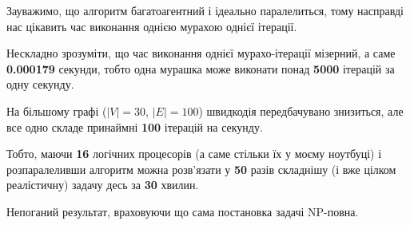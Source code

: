\documentclass[a4paper, 12pt]{article}
\numberwithin{equation}{section}
\begin{document}
Зауважимо, що алгоритм багатоагентний і ідеально паралелиться, тому насправді нас цікавить час виконання однією мурахою однієї ітерації.  \medskip

Нескладно зрозуміти, що час виконання однієї мурахо-ітерації мізерний, а саме \textbf{0.000179} секунди, тобто одна мурашка може виконати понад \textbf{5000} ітерацій за одну секунду. \medskip

На більшому графі ($\vert V \vert = 30$, $\vert E \vert = 100$) швидкодія передбачувано знизиться, але все одно складе принаймні \textbf{100} ітерацій на секунду. \medskip

Тобто, маючи \textbf{16} логічних процесорів (а саме стільки їх у моєму ноутбуці) і розпаралеливши алгоритм можна розв'язати у \textbf{50} разів складнішу (і вже цілком реалістичну) задачу десь за \textbf{30} хвилин. \medskip

Непоганий результат, враховуючи що сама постановка задачі NP-повна.

% 
% 
\end{document}
